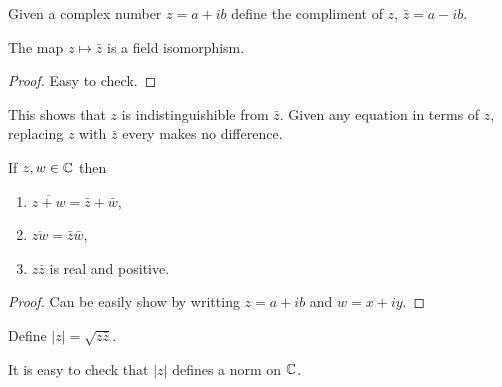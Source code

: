 \begin{definition}
  Given a complex number $z = a+ib$ define the compliment of $z$, $\bar{z} = a-ib$.
\end{definition}
\begin{theorem}
  The map $z\mapsto \bar{z}$ is a field isomorphism.
\end{theorem}
\begin{proof}
  Easy to check.
\end{proof}
\begin{remark}
  This shows that $z$ is indistinguishible from $\bar{z}$. Given any equation in terms of $z$, replacing $z$ with $\bar{z}$ every makes no difference.
\end{remark}
\begin{theorem}
  If $z,w\in \mathbb{C}$ then
   \begin{enumerate}
     \item $\overline{z+w} = \bar{z} + \bar{w}$,
     \item $\overline{zw} =\bar{z}\bar{w}$, 
     \item $z\bar{z}$ is real and positive.
   \end{enumerate} 
\end{theorem}
\begin{proof}
  Can be easily show by writting $z=a+ib$ and $w=x+iy$.
\end{proof}
\begin{definition}
  Define $|z| = \sqrt{z\bar{z}}$.
\end{definition}
\begin{remark}
  It is easy to check that $|z|$ defines a norm on $\mathbb{C}$.
\end{remark}
